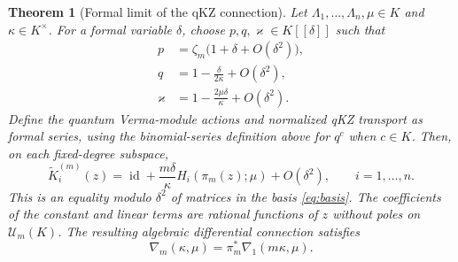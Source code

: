 \documentclass[12pt]{amsart}
\newtheorem{thm}{Theorem}[section]
\theoremstyle{definition}
\numberwithin{equation}{section}
\theoremstyle{definition}
\let\mc\mathcal
\let\ka\kappa
\let\La\Lambda
\let\on\operatorname
\def\id{\on{id}}
\def\beq{\begin{equation}}
\def\eeq{\end{equation}}
\begin{document}
\begin{thm}[Formal limit of the qKZ connection]
\label{thm:formal-root-limit}
Let $\La_1,\ldots,\La_n,\mu\in K$ and $\ka\in K^\times$.
For a formal variable $\delta$, choose
$p,q,\varkappa\in K[[\delta]]$ such that
\beq\label{eq:formal-scaling}
 \begin{aligned}
 p&=\zeta_m\bigl(1+\delta+O(\delta^2)\bigr),\\
 q&=1-\frac{\delta}{2\ka}+O(\delta^2),\\
 \varkappa&=1-\frac{2\mu\delta}{\ka}+O(\delta^2).
 \end{aligned}
\eeq
Define the quantum Verma-module actions and normalized qKZ
transport as formal series, using the binomial-series definition above for
$q^c$ when $c\in K$.  Then, on each fixed-degree subspace,
\beq\label{eq:formal-transport}
 \boxed{\quad
 \widetilde K_i^{(m)}(z)
 =\id+\frac{m\delta}{\ka}H_i(\pi_m(z);\mu)
      +O(\delta^2),\qquad i=1,\ldots,n.
 \quad}
\eeq
This is an equality modulo $\delta^2$ of matrices in the
basis \eqref{eq:basis}.  The coefficients of the constant and
linear terms are rational functions of $z$ without poles on
$\mc U_m(K)$.
The resulting algebraic differential connection satisfies
\beq\label{eq:formal-pullback}
 \boxed{\quad
 \nabla_m(\ka,\mu)=\pi_m^*\nabla_1(m\ka,\mu).
 \quad}
\eeq
\end{thm}
\end{document}
